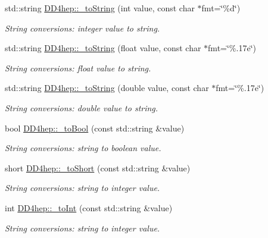 \begin{DoxyCompactItemize}
std\+::string \hyperlink{group___d_d4_h_e_p___g_e_o_m_e_t_r_y_ga7c5be2d7907e4e1d8ce7a2396b10b695}{D\+D4hep\+::\+\_\+to\+String} (int value, const char $\ast$fmt=\char`\"{}\%d\char`\"{})
\begin{DoxyCompactList}\small\item\em String conversions\+: integer value to string. \end{DoxyCompactList}\item 
std\+::string \hyperlink{group___d_d4_h_e_p___g_e_o_m_e_t_r_y_ga0ade5df64f54ccda654522ce830b3c15}{D\+D4hep\+::\+\_\+to\+String} (float value, const char $\ast$fmt=\char`\"{}\%.\+17e\char`\"{})
\begin{DoxyCompactList}\small\item\em String conversions\+: float value to string. \end{DoxyCompactList}\item 
std\+::string \hyperlink{group___d_d4_h_e_p___g_e_o_m_e_t_r_y_ga4e976c2563bd851ad9569c4a9c28d73a}{D\+D4hep\+::\+\_\+to\+String} (double value, const char $\ast$fmt=\char`\"{}\%.\+17e\char`\"{})
\begin{DoxyCompactList}\small\item\em String conversions\+: double value to string. \end{DoxyCompactList}\item 
bool \hyperlink{group___d_d4_h_e_p___g_e_o_m_e_t_r_y_ga57c16649c26dda84c503948b57737b47}{D\+D4hep\+::\+\_\+to\+Bool} (const std\+::string \&value)
\begin{DoxyCompactList}\small\item\em String conversions\+: string to boolean value. \end{DoxyCompactList}\item 
short \hyperlink{group___d_d4_h_e_p___g_e_o_m_e_t_r_y_gaef47a03e8cfb41d0bc2d598c16b7b9f2}{D\+D4hep\+::\+\_\+to\+Short} (const std\+::string \&value)
\begin{DoxyCompactList}\small\item\em String conversions\+: string to integer value. \end{DoxyCompactList}\item 
int \hyperlink{group___d_d4_h_e_p___g_e_o_m_e_t_r_y_ga6222fc401a48bcb4a2c176291bf4821b}{D\+D4hep\+::\+\_\+to\+Int} (const std\+::string \&value)
\begin{DoxyCompactList}\small\item\em String conversions\+: string to integer value. \end{DoxyCompactList}\item 

\end{DoxyCompactItemize}
